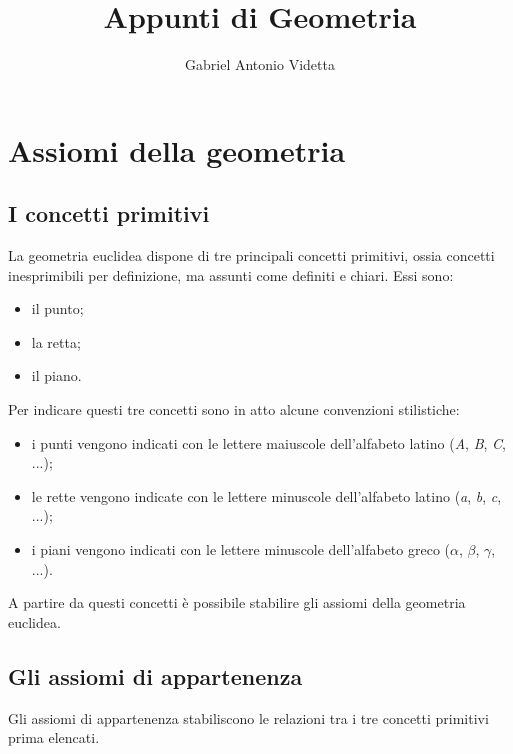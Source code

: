 \documentclass{article}
\theoremstyle{definition}
\begin{document}
\author{Gabriel Antonio Videtta}
\title{Appunti di Geometria}

\maketitle
\newpage

\tableofcontents
\newpage

\section{Assiomi della geometria}

\subsection{I concetti primitivi}

La geometria euclidea dispone di tre principali concetti primitivi,
ossia concetti inesprimibili per definizione, ma assunti come
definiti e chiari. Essi sono:

\begin{itemize}[noitemsep]
    \item il punto;
    \item la retta;
    \item il piano.
\end{itemize}

Per indicare questi tre concetti sono in atto alcune convenzioni
stilistiche:

\begin{itemize}[noitemsep]
    \item i punti vengono indicati con le lettere
          maiuscole dell'alfabeto latino (\emph{A}, \emph{B}, \emph{C}, ...);
    \item le rette vengono indicate con le lettere
          minuscole dell'alfabeto latino (\emph{a}, \emph{b}, \emph{c}, ...);
    \item i piani vengono indicati con le lettere
          minuscole dell'alfabeto greco ($\alpha$, $\beta$, $\gamma$, ...).
\end{itemize}

A partire da questi concetti è possibile stabilire gli assiomi
della geometria euclidea.

\subsection{Gli assiomi di appartenenza}

Gli assiomi di appartenenza stabiliscono le relazioni tra i
tre concetti primitivi prima elencati.
\end{document}

